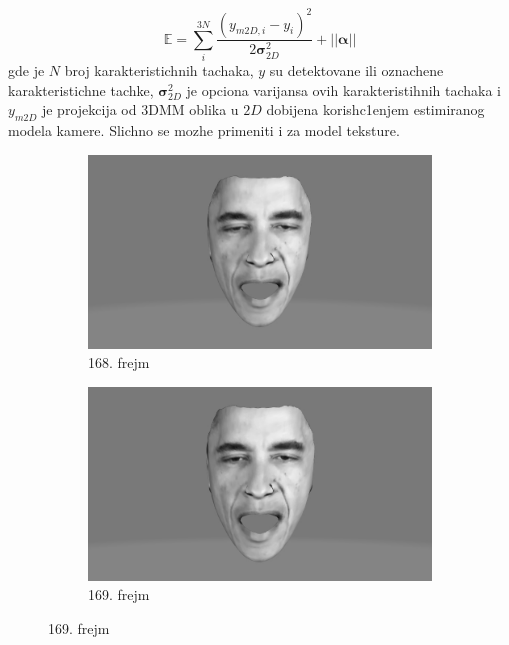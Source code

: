 \documentclass[a4paper, openany, oneside, 11pt]{book}
\begin{document}
\begin{equation}
\mathbb{E} = \sum^{3N}_i \frac{(y_{m2D,i}-y_i)^2}{2\mathbf{\sigma}^2_{2D}}+||\mathbf{\alpha}||
\end{equation}
gde je $N$ broj karakteristichnih tachaka, $y$ su detektovane ili oznachene karakteristichne tachke, $\mathbf{\sigma}^2_{2D}$ je opciona varijansa ovih karakteristihnih tachaka i $y_{m2D}$ je projekcija od \acrshort{3DMM} oblika u $2D$ dobijena korish\-c1enjem estimiranog modela kamere. Slichno se mozhe primeniti i za model teksture.
\begin{figure}[!h]
        \centering
        \begin{subfigure}{0.475\textwidth}
            \centering
            \includegraphics[scale=0.3]{res/168_3D.jpg}
            \caption{168. frejm}
            \label{fig:2_7a}
            \vspace{0pt}
        \end{subfigure}%
        \begin{subfigure}{0.475\textwidth}
            \centering
            \includegraphics[scale=0.3]{res/169_3D.jpg}
            \caption{169. frejm}

\end{subfigure}
\end{figure}
\end{document}
